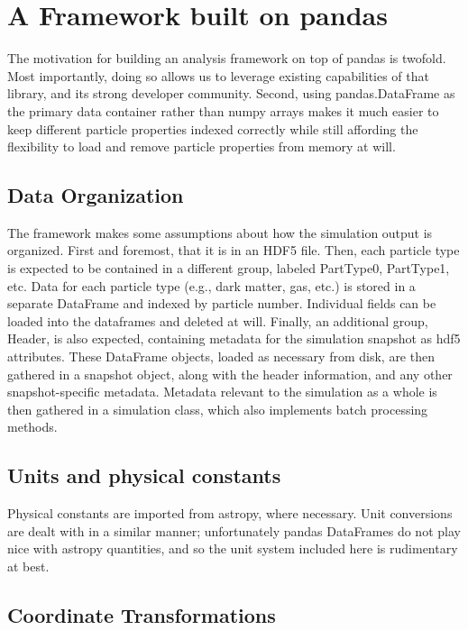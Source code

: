\section{A Framework built on pandas}
\label{framework}

The motivation for building an analysis framework on top of pandas is twofold.  Most importantly, doing so allows us to leverage existing capabilities of that library, and its strong developer community.  Second, using pandas.DataFrame as the primary data container rather than numpy arrays makes it much easier to keep different particle properties indexed correctly while still affording the flexibility to load and remove particle properties from memory at will.

\subsection{Data Organization}
\label{hierarchy}
The framework makes some assumptions about how the simulation output is organized.  First and foremost, that it is in an HDF5 file.  Then, each particle type is expected to be contained in a different group, labeled PartType0, PartType1, etc. Data for each particle type (e.g., dark matter, gas, etc.) is stored in a separate DataFrame and indexed by particle number.  Individual fields can be loaded into the dataframes and deleted at will.  Finally, an additional group, Header, is also expected, containing metadata for the simulation snapshot as hdf5 attributes.  These DataFrame objects, loaded as necessary from disk, are then gathered in a snapshot object, along with the header information, and any other snapshot-specific metadata.  Metadata relevant to the simulation as a whole is then gathered in a simulation class, which also implements batch processing methods.

\subsection{Units and physical constants}
\label{units}
Physical constants are imported from astropy, where necessary.  Unit conversions are dealt with in a similar manner; unfortunately pandas DataFrames do not play nice with astropy quantities, and so the unit system included here is rudimentary at best.

\subsection{Coordinate Transformations}
\label{coordinates}
